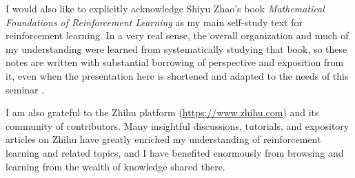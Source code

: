 \documentclass[11pt]{article}
\newcommand{\1}{\mathbf{1}}
\begin{document}
I would also like to explicitly acknowledge Shiyu Zhao's book \emph{Mathematical Foundations of Reinforcement Learning} as my main self-study text for reinforcement learning. In a very real sense, the overall organization and much of my understanding were learned from systematically studying that book, so these notes are written with substantial borrowing of perspective and exposition from it, even when the presentation here is shortened and adapted to the needs of this seminar \cite{Zhao2025}.

I am also grateful to the Zhihu platform (\url{https://www.zhihu.com}) and its community of contributors. Many insightful discussions, tutorials, and expository articles on Zhihu have greatly enriched my understanding of reinforcement learning and related topics, and I have benefited enormously from browsing and learning from the wealth of knowledge shared there.
\end{document}

